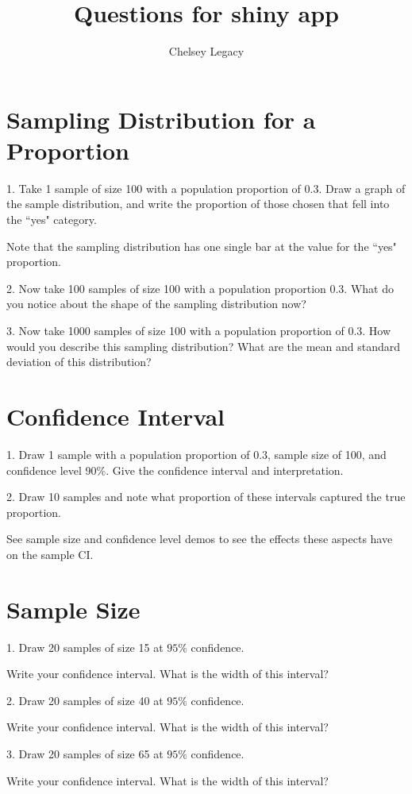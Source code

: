 \documentclass[11pt]{amsart}
\title{Questions for shiny app}
\author{Chelsey Legacy}
\begin{document}
\maketitle
\section{Sampling Distribution for a Proportion}
1.  Take 1 sample of size 100 with a population proportion of 0.3. Draw a graph of the sample distribution, and write the proportion of those chosen that fell into the ``yes" category. 


Note that the sampling distribution has one single bar at the value for the ``yes" proportion.

2.  Now take 100 samples of size 100 with a population proportion 0.3.  What do you notice about the shape of the sampling distribution now?

3. Now take 1000 samples of size 100 with a population proportion of 0.3.  How would you describe this sampling distribution? What are the mean and standard deviation of this distribution?
\section{Confidence Interval}

1. Draw 1 sample with a population proportion of 0.3, sample size of 100, and confidence level 90$\%$. Give the confidence interval and interpretation.

2. Draw 10 samples and note what proportion of these intervals captured the true proportion.


See sample size and confidence level demos to see the effects these aspects have on the sample CI.


\section{Sample Size}

1. Draw 20 samples of size 15 at $95\%$ confidence.

Write your confidence interval.  What is the width of this interval?
 
 2. Draw 20 samples of size 40 at $95\%$ confidence.


 
Write your confidence interval.  What is the width of this interval?
 
 
 3. Draw 20 samples of size 65 at $95\%$ confidence.


Write your confidence interval.  What is the width of this interval?
\end{document}
